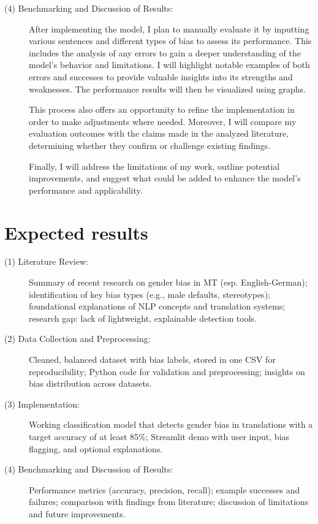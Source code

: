 \documentclass[oneside, paper=A4, DIV=15]{scrartcl}
\begin{document}
\begin{description}
\item[(4) Benchmarking and Discussion of Results:] 

After implementing the model, I plan to manually evaluate it by inputting various sentences and different types of bias to assess its performance. This includes the analysis of any errors to gain a deeper understanding of the model's behavior and limitations. I will highlight notable examples of both errors and successes to provide valuable insights into its strengths and weaknesses. The performance results will then be visualized using graphs. 

This process also offers an opportunity to refine the implementation in order to make adjustments where needed. Moreover, I will compare my evaluation outcomes with the claims made in the analyzed literature, determining whether they confirm or challenge existing findings.

Finally, I will address the limitations of my work, outline potential improvements, and suggest what could be added to enhance the model's performance and applicability.


\end{description}


\section{Expected results}
\begin{description}

\item[(1) Literature Review:]
Summary of recent research on gender bias in MT (esp. English-German); identification of key bias types (e.g., male defaults, stereotypes); foundational explanations of NLP concepts and translation systems; research gap: lack of lightweight, explainable detection tools.

\item[(2) Data Collection and Preprocessing:]
Cleaned, balanced dataset with bias labels, stored in one CSV for reproducibility; Python code for validation and preprocessing; insights on bias distribution across datasets.

\item[(3) Implementation:]
Working classification model that detects gender bias in translations with a target accuracy of at least 85\%; Streamlit demo with user input, bias flagging, and optional explanations.

\item[(4) Benchmarking and Discussion of Results:]
Performance metrics (accuracy, precision, recall); example successes and failures; comparison with findings from literature; discussion of limitations and future improvements.

\end{description} 
\end{document}
